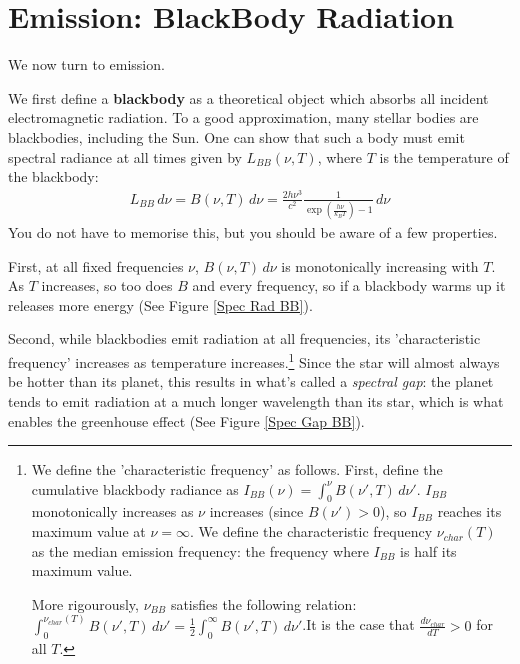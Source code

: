 \section{Emission: BlackBody Radiation}

We now turn to emission.

We first define a \textbf{blackbody} as a theoretical object which absorbs all incident electromagnetic radiation. To a good approximation, many stellar bodies are blackbodies, including the Sun. One can show that such a body must emit spectral radiance at all times given by $L_{BB}(\nu,T)$, where $T$ is the temperature of the blackbody:
\begin{align}
    \boxed{L_{BB}\,d\nu=B(\nu,T)\,d\nu=\frac{2h\nu^3}{c^2}\frac{1}{\exp\left( \frac{h\nu}{k_BT} \right)-1}\,d\nu}
\end{align}
You do not have to memorise this, but you should be aware of a few properties. 

First, at all fixed frequencies $\nu$, $B(\nu,T)\,d\nu$ is monotonically increasing with $T$. As $T$ increases, so too does $B$ and every frequency, so if a blackbody warms up it releases more energy (See Figure \ref{Spec Rad BB}).

Second, while blackbodies emit radiation at all frequencies, its 'characteristic frequency' increases as temperature increases.\footnote{
    We define the 'characteristic frequency' as follows. First, define the cumulative blackbody radiance as $I_{BB}(\nu)=\int_0^\nu B(\nu',T)\,d\nu'$. $I_{BB}$ monotonically increases as $\nu$ increases (since $B(\nu')>0$), so $I_{BB}$ reaches its maximum value at $\nu=\infty$. We define the characteristic frequency $\nu_{char}(T)$ as the median emission frequency: the frequency where $I_{BB}$ is half its maximum value. 
    
    More rigourously, $\nu_{BB}$ satisfies the following relation: $\int_0^{\nu_{char}(T)} B(\nu',T)\,d\nu'=\frac{1}{2}\int_0^\infty B(\nu',T)\,d\nu'$.\footnotemark  It is the case that $\frac{d\nu_{char}}{dT}>0$ for all $T$.
} 
Since the star will almost always be hotter than its planet, this results in what's called a \textit{spectral gap}: the planet tends to emit radiation at a much longer wavelength than its star, which is what enables the greenhouse effect (See Figure \ref{Spec Gap BB}).

